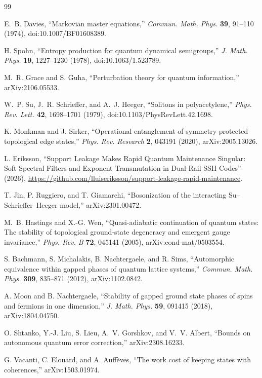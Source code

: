 \documentclass[11pt,a4paper]{article}
\theoremstyle{remark}
\begin{document}
\small
\begin{thebibliography}{99}
\setlength{\itemsep}{0.15em}

E.~B. Davies,
``Markovian master equations,''
\emph{Commun. Math. Phys.} \textbf{39}, 91--110 (1974),
doi:10.1007/BF01608389.

H. Spohn,
``Entropy production for quantum dynamical semigroups,''
\emph{J. Math. Phys.} \textbf{19}, 1227--1230 (1978),
doi:10.1063/1.523789.

M.~R. Grace and S. Guha,
``Perturbation theory for quantum information,''
arXiv:2106.05533.

W.~P. Su, J.~R. Schrieffer, and A.~J. Heeger,
``Solitons in polyacetylene,''
\emph{Phys. Rev. Lett.} \textbf{42}, 1698--1701 (1979),
doi:10.1103/PhysRevLett.42.1698.

K. Monkman and J. Sirker,
``Operational entanglement of symmetry-protected topological edge states,''
\emph{Phys. Rev. Research} \textbf{2}, 043191 (2020),
arXiv:2005.13026.

L. Eriksson,
``Support Leakage Makes Rapid Quantum Maintenance Singular: Soft Spectral Filters and Exponent Transmutation in Dual-Rail SSH Codes'' (2026),
\url{https://github.com/lluiseriksson/support-leakage-rapid-maintenance}.

T. Jin, P. Ruggiero, and T. Giamarchi,
``Bosonization of the interacting Su--Schrieffer--Heeger model,''
arXiv:2301.00472.

M.~B. Hastings and X.-G. Wen,
``Quasi-adiabatic continuation of quantum states: The stability of topological ground-state degeneracy and emergent gauge invariance,''
\emph{Phys. Rev. B} \textbf{72}, 045141 (2005),
arXiv:cond-mat/0503554.

S. Bachmann, S. Michalakis, B. Nachtergaele, and R. Sims,
``Automorphic equivalence within gapped phases of quantum lattice systems,''
\emph{Commun. Math. Phys.} \textbf{309}, 835--871 (2012),
arXiv:1102.0842.

A. Moon and B. Nachtergaele,
``Stability of gapped ground state phases of spins and fermions in one dimension,''
\emph{J. Math. Phys.} \textbf{59}, 091415 (2018),
arXiv:1804.04750.

O. Shtanko, Y.-J. Liu, S. Lieu, A.~V. Gorshkov, and V.~V. Albert,
``Bounds on autonomous quantum error correction,''
arXiv:2308.16233.

G. Vacanti, C. Elouard, and A. Auff\`eves,
``The work cost of keeping states with coherences,''
arXiv:1503.01974.

\end{thebibliography}
\end{document}

